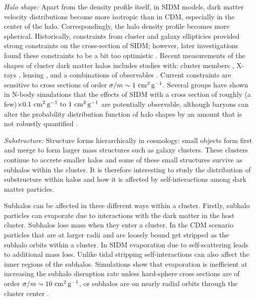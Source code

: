 \emph{Halo shape: }Apart from the density profile itself, in SIDM models, dark matter velocity distributions become more isotropic than in CDM, especially in the center of the halo.  Correspondingly,  the halo density profile becomes more spherical.  Historically, constraints from cluster and galaxy ellipticies \citep{Miralde-Escuda:2000} provided strong constraints on the cross-section of SIDM; however, later investigations found these constraints to be a bit too optimistic \citep{Peter:2013}. 
Recent measurements of the shapes of cluster dark matter halos includes studies with: cluster members \citep{2018MNRAS.475.2421S},  X-rays \citep{Hashimoto:2007},  lensing \citep{Mandelbaum:2006, Evans:2009, Oguri:2010}, and a combinations of observables \citep{Clampitt:2016, Sereno:2018}.  
Current constraints are sensitive to cross sections of order $\sigma / m \sim 1 \mathrm{\,\mathrm{\,cm}^2\mathrm{\,g}^{-1}}$.
Several groups have shown in N-body simulations that the effects of SIDM with a cross section of roughly (a few)$\times 0.1 \mathrm{\,\mathrm{\,cm}^2\mathrm{\,g}^{-1}} \hbox{ to } 1 \mathrm{\,\mathrm{\,cm}^2\mathrm{\,g}^{-1}}$ are potentially observable, although baryons can alter the probability distribution function of halo shapes by an amount that is not robustly quantified \citep[\eg][]{Peter:2013, Robertson:2017mgj, Brinckmann:2018}.





\emph{Substructure: }Structure forms hierarchically in cosmology: small objects form first and merge to form larger mass structures such as galaxy clusters. These clusters continue to accrete smaller halos and some of these small structures survive as subhalos within the cluster. It is therefore interesting to study the distribution of substructure within halos and how it is affected by self-interactions among dark matter particles. 

Subhalos can be affected in three different ways within a cluster. Firstly, subhalo particles can evaporate due to interactions with the dark matter in the host cluster. Subhalos lose mass when they enter a cluster. In the CDM scenario particles that are at larger radii and are loosely bound get stripped as the subhalo orbits within a cluster. In SIDM evaporation due to self-scattering leads to additional mass loss. Unlike tidal stripping self-interactions can also affect the inner regions of the subhalos. Simulations show that evaporation is inefficient at increasing the subhalo disruption rate unless hard-sphere cross sections are of order $\sigma/m\sim 10\mathrm{\,\mathrm{\,cm}^2\mathrm{\,g}^{-1}}$, or subhalos are on nearly radial orbits through the cluster center \citep{2012MNRAS.423.3740V,Rocha:2012jg,Dooley:2016ajo}. 

